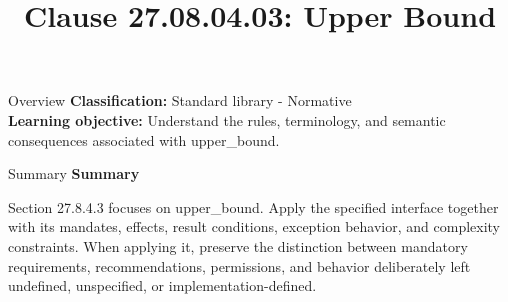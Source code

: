 \documentclass[10pt,letterpaper]{article}
\title{Clause 27.08.04.03: Upper Bound}
\author{}
\date{}
\begin{document}
\maketitle
\begin{CornellOverviewBox}{Overview}
\textbf{Classification:} Standard library - Normative\\[2pt]
\textbf{Learning objective:} Understand the rules, terminology, and semantic consequences associated with upper\_bound.
\end{CornellOverviewBox}\begin{CornellSummaryBox}{Summary}
{\sffamily\bfseries\color{Accent} Summary}\par\vspace{3pt}Section 27.8.4.3 focuses on upper\_bound. Apply the specified interface together with its mandates, effects, result conditions, exception behavior, and complexity constraints. When applying it, preserve the distinction between mandatory requirements, recommendations, permissions, and behavior deliberately left undefined, unspecified, or implementation-defined.
\end{CornellSummaryBox}
\end{document}
